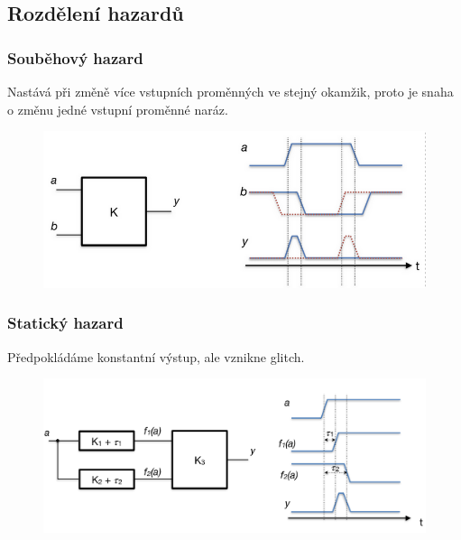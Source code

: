 \subsection{Rozdělení hazardů}
\subsubsection{Souběhový hazard}
Nastává při změně více vstupních proměnných ve stejný okamžik, proto je snaha o změnu jedné vstupní proměnné naráz.
\newpage
\begin{figure}[h!]
    \centering
    \includegraphics[scale = 0.5]{img/SoubehH.png}
\end{figure}

\subsubsection{Statický hazard}
Předpokládáme konstantní výstup, ale vznikne glitch.\\
\begin{figure}[h!]
    \centering
    \includegraphics[scale= 0.3]{img/StatH.png}
\end{figure}

